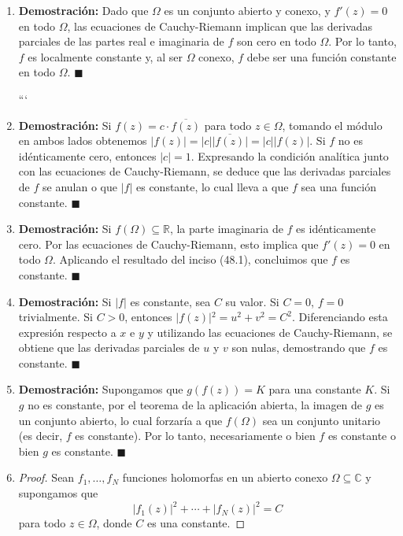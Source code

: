 \documentclass[11pt,a4paper]{article}
\theoremstyle{definition}
\theoremstyle{plain}
\theoremstyle{remark}
\begin{document}
	\begin{enumerate}
		\item[(48.1)] \textbf{Demostración:} Dado que $\Omega$ es un conjunto abierto y conexo, y $f'(z) = 0$ en todo $\Omega$, las ecuaciones de Cauchy-Riemann implican que las derivadas parciales de las partes real e imaginaria de $f$ son cero en todo $\Omega$. Por lo tanto, $f$ es localmente constante y, al ser $\Omega$ conexo, $f$ debe ser una función constante en todo $\Omega$. $\blacksquare$
		
		```
		\item[(48.2)] \textbf{Demostración:} Si $f(z) = c \cdot \overline{f(z)}$ para todo $z \in \Omega$, tomando el módulo en ambos lados obtenemos $\vert{}f(z)\vert{} = \vert{}c\vert{} \vert{}\overline{f(z)}\vert{} = \vert{}c\vert{} \vert{}f(z)\vert{}$. Si $f$ no es idénticamente cero, entonces $\vert{}c\vert{} = 1$. Expresando la condición analítica junto con las ecuaciones de Cauchy-Riemann, se deduce que las derivadas parciales de $f$ se anulan o que $\vert{}f\vert{}$ es constante, lo cual lleva a que $f$ sea una función constante. $\blacksquare$
		
		\item[(48.3)] \textbf{Demostración:} Si $f(\Omega) \subseteq \mathbb{R}$, la parte imaginaria de $f$ es idénticamente cero. Por las ecuaciones de Cauchy-Riemann, esto implica que $f'(z) = 0$ en todo $\Omega$. Aplicando el resultado del inciso (48.1), concluimos que $f$ es constante. $\blacksquare$
		
		\item[(48.4)] \textbf{Demostración:} Si $\vert{}f\vert{}$ es constante, sea $C$ su valor. Si $C = 0$, $f = 0$ trivialmente. Si $C > 0$, entonces $\vert{}f(z)\vert{}^2 = u^2 + v^2 = C^2$. Diferenciando esta expresión respecto a $x$ e $y$ y utilizando las ecuaciones de Cauchy-Riemann, se obtiene que las derivadas parciales de $u$ y $v$ son nulas, demostrando que $f$ es constante. $\blacksquare$
		
		\item[(48.5)] \textbf{Demostración:} Supongamos que $g(f(z)) = K$ para una constante $K$. Si $g$ no es constante, por el teorema de la aplicación abierta, la imagen de $g$ es un conjunto abierto, lo cual forzaría a que $f(\Omega)$ sea un conjunto unitario (es decir, $f$ es constante). Por lo tanto, necesariamente o bien $f$ es constante o bien $g$ es constante. $\blacksquare$
		
		\item[(48.6)] \begin{proof}
			Sean $f_1,\ldots,f_N$ funciones holomorfas en un abierto conexo
			$\Omega\subseteq\mathbb{C}$ y supongamos que
			\[
			|f_1(z)|^2+\cdots+|f_N(z)|^2=C
			\]
			para todo $z\in\Omega$, donde $C$ es una constante.
			

\end{proof}
\end{enumerate}
\end{document}
